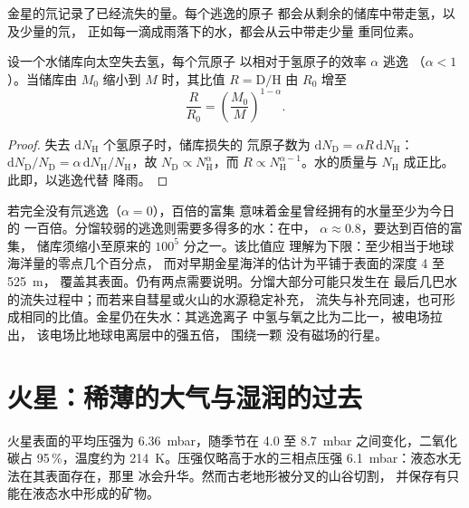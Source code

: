 金星的氘记录了已经流失的量。每个逃逸的原子
都会从剩余的储库中带走氢，以及少量的氘，
正如每一滴成雨落下的水，都会从云中带走少量
重同位素。

\begin{proposition}[逃逸导致的同位素富集]\label{prop:b3:planetary-atmospheres:dh}
设一个水储库向太空失去氢，每个氘原子
以相对于氢原子的效率 $\alpha$ 逃逸
（$\alpha < 1$）。当储库由 $M_0$ 缩小到 $M$ 时，其比值
$R = \mathrm{D}/\mathrm{H}$ 由 $R_0$ 增至
\[
\frac R{R_0} = \left(\frac{M_0}M\right)^{1-\alpha}.
\]
\end{proposition}

\begin{proof}
失去 $\mathrm dN_\mathrm H$ 个氢原子时，储库损失的
氘原子数为 $\mathrm dN_\mathrm D = \alpha R\,\mathrm dN_\mathrm H$：
$\mathrm dN_\mathrm D/N_\mathrm D = \alpha\,\mathrm dN_\mathrm H/
N_\mathrm H$，故 $N_\mathrm D \propto N_\mathrm H^\alpha$，而 $R \propto
N_\mathrm H^{\alpha - 1}$。水的质量与
$N_\mathrm H$ 成正比。此即，以逃逸代替
降雨。
\end{proof}

若完全没有氘逃逸（$\alpha = 0$），百倍的富集
意味着金星曾经拥有的水量至少为今日的
一百倍。分馏较弱的逃逸则需要多得多的水：在中，
$\alpha \approx 0.8$，要达到百倍的富集，
储库须缩小至原来的 $100^5$ 分之一。该比值应
理解为下限：至少相当于地球海洋量的零点几个百分点，
而对早期金星海洋的估计为平铺于表面的深度 4 至 \qty{525}{m}，
覆盖其表面。仍有两点需要说明。分馏大部分可能只发生在
最后几巴水的流失过程中；而若来自彗星或火山的水源稳定补充，
流失与补充同速，也可形成相同的比值。金星仍在失水：其逃逸离子
中氢与氧之比为二比一，被电场拉出，
该电场比地球电离层中的强五倍，
围绕一颗
没有磁场的行星。

\section{火星：稀薄的大气与湿润的过去}\label{sec:b3:planetary-atmospheres:mars}

火星表面的平均压强为 \qty{6.36}{mbar}，随季节在 4.0 至
\qty{8.7}{mbar} 之间变化，二氧化碳占 95\,\%，温度约为
\qty{214}{K}。压强仅略高于水的三相点压强
\qty{6.1}{mbar}：液态水无法在其表面存在，那里
冰会升华。然而古老地形被分叉的山谷切割，
并保存有只能在液态水中形成的矿物。

